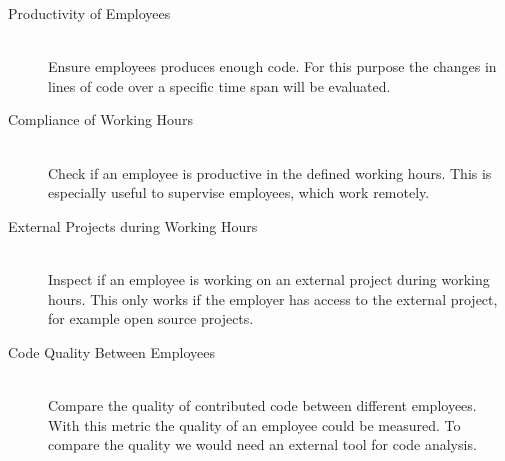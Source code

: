 \begin{description}
    \item[Productivity of Employees] \hfill \\
        Ensure employees produces enough code.
        For this purpose the changes in lines of code over a specific time span will be evaluated.

    \item[Compliance of Working Hours] \hfill \\
        Check if an employee is productive in the defined working hours.
        This is especially useful to supervise employees, which work remotely.

    \item[External Projects during Working Hours] \hfill \\
        Inspect if an employee is working on an external project during working hours.
        This only works if the employer has access to the external project, for example open source projects.

    \item[Code Quality Between Employees] \hfill \\
        Compare the quality of contributed code between different employees.
        With this metric the quality of an employee could be measured.
        To compare the quality we would need an external tool for code analysis.
\end{description}



